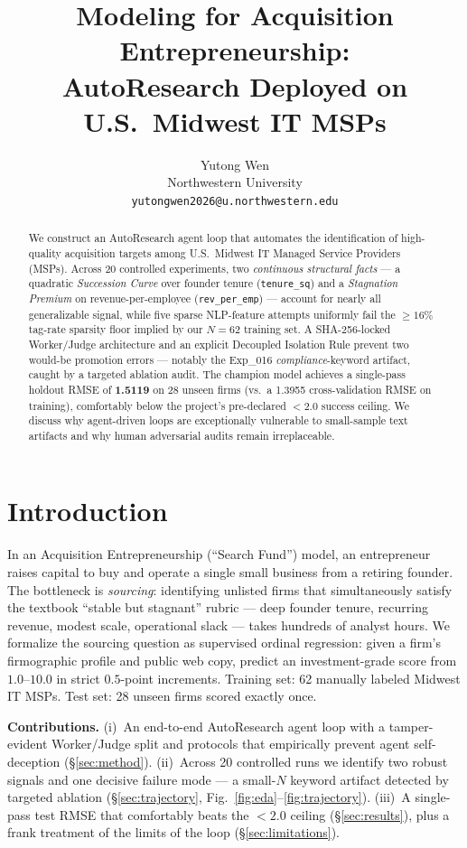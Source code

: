 \documentclass{article}
\title{Modeling for Acquisition Entrepreneurship:\\
       AutoResearch Deployed on U.S.\ Midwest IT MSPs}
\author{Yutong Wen
\\ Northwestern University
\\ \texttt{yutongwen2026@u.northwestern.edu}}
\begin{document}
\maketitle

\begin{abstract}
We construct an AutoResearch agent loop that automates the identification of high-quality
acquisition targets among U.S.\ Midwest IT Managed Service Providers (MSPs). Across 20
controlled experiments, two \emph{continuous structural facts} --- a quadratic
\emph{Succession Curve} over founder tenure (\texttt{tenure\_sq}) and a \emph{Stagnation
Premium} on revenue-per-employee (\texttt{rev\_per\_emp}) --- account for nearly all
generalizable signal, while five sparse NLP-feature attempts uniformly fail the
$\geq 16\%$ tag-rate sparsity floor implied by our $N{=}62$ training set. A SHA-256-locked
Worker/Judge architecture and an explicit Decoupled Isolation Rule prevent two would-be
promotion errors --- notably the Exp\_016 \emph{compliance}-keyword artifact, caught by
a targeted ablation audit. The champion model achieves a single-pass holdout RMSE of
\textbf{1.5119} on 28 unseen firms (vs.\ a 1.3955 cross-validation RMSE on training),
comfortably below the project's pre-declared $<2.0$ success ceiling. We discuss why
agent-driven loops are exceptionally vulnerable to small-sample text artifacts and why
human adversarial audits remain irreplaceable.
\end{abstract}

\section{Introduction}
\label{sec:intro}
In an Acquisition Entrepreneurship (``Search Fund'') model, an entrepreneur raises capital
to buy and operate a single small business from a retiring founder. The bottleneck is
\emph{sourcing}: identifying unlisted firms that simultaneously satisfy the textbook
``stable but stagnant'' rubric --- deep founder tenure, recurring revenue, modest scale,
operational slack --- takes hundreds of analyst hours. We formalize the sourcing question
as supervised ordinal regression: given a firm's firmographic profile and public web copy,
predict an investment-grade score from $1.0$--$10.0$ in strict $0.5$-point increments.
Training set: 62 manually labeled Midwest IT MSPs. Test set: 28 unseen firms scored
exactly once.

\textbf{Contributions.}
(i)~An end-to-end AutoResearch agent loop with a tamper-evident Worker/Judge split and
protocols that empirically prevent agent self-deception (\S\ref{sec:method}).
(ii)~Across 20 controlled runs we identify two robust signals and one decisive failure
mode --- a small-$N$ keyword artifact detected by targeted ablation
(\S\ref{sec:trajectory}, Fig.~\ref{fig:eda}--\ref{fig:trajectory}).
(iii)~A single-pass test RMSE that comfortably beats the $<2.0$ ceiling
(\S\ref{sec:results}), plus a frank treatment of the limits of the loop
(\S\ref{sec:limitations}).
\end{document}

